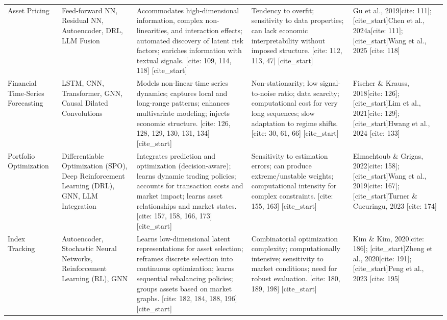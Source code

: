 \begin{table}[htbp]
\begin{tabularx}{\textwidth}{>{\RaggedRight}X >{\RaggedRight}X >{\RaggedRight}X >{\RaggedRight}X >{\RaggedRight\arraybackslash}X}
[cite_start]Asset Pricing & Feed-forward NN, Residual NN, Autoencoder, DRL, LLM Fusion & Accommodates high-dimensional information, complex non-linearities, and interaction effects; automated discovery of latent risk factors; enriches information with textual signals. [cite: 109, 114, 118] [cite_start]& Tendency to overfit; sensitivity to data properties; can lack economic interpretability without imposed structure. [cite: 112, 113, 47] [cite_start]& Gu et al., 2019[cite: 111]; [cite_start]Chen et al., 2024a[cite: 111]; [cite_start]Wang et al., 2025 [cite: 118] \\
Financial Time-Series Forecasting & LSTM, CNN, Transformer, GNN, Causal Dilated Convolutions & Models non-linear time series dynamics; captures local and long-range patterns; enhances multivariate modeling; injects economic structure. [cite: 126, 128, 129, 130, 131, 134] [cite_start]& Non-stationarity; low signal-to-noise ratio; data scarcity; computational cost for very long sequences; slow adaptation to regime shifts. [cite: 30, 61, 66] [cite_start]& Fischer \& Krauss, 2018[cite: 126]; [cite_start]Lim et al., 2021[cite: 129]; [cite_start]Hwang et al., 2024 [cite: 133] \\
Portfolio Optimization & Differentiable Optimization (SPO), Deep Reinforcement Learning (DRL), GNN, LLM Integration & Integrates prediction and optimization (decision-aware); learns dynamic trading policies; accounts for transaction costs and market impact; learns asset relationships and market states. [cite: 157, 158, 166, 173] [cite_start]& Sensitivity to estimation errors; can produce extreme/unstable weights; computational intensity for complex constraints. [cite: 155, 163] [cite_start]& Elmachtoub \& Grigas, 2022[cite: 158]; [cite_start]Wang et al., 2019[cite: 167]; [cite_start]Turner \& Cucuringu, 2023 [cite: 174] \\
Index Tracking & Autoencoder, Stochastic Neural Networks, Reinforcement Learning (RL), GNN & Learns low-dimensional latent representations for asset selection; reframes discrete selection into continuous optimization; learns sequential rebalancing policies; groups assets based on market graphs. [cite: 182, 184, 188, 196] [cite_start]& Combinatorial optimization complexity; computationally intensive; sensitivity to market conditions; need for robust evaluation. [cite: 180, 189, 198] [cite_start]& Kim \& Kim, 2020[cite: 186]; [cite_start]Zheng et al., 2020[cite: 191]; [cite_start]Peng et al., 2023 [cite: 195] \\

\end{tabularx}
\end{table}
